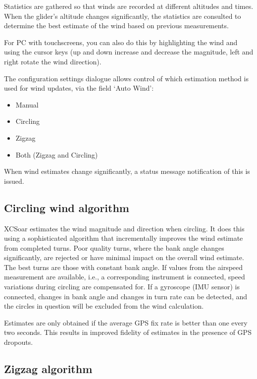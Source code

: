 Statistics are gathered so that winds are recorded at different
altitudes and times.  When the glider's altitude changes significantly,
the statistics are consulted to determine the best estimate of the
wind based on previous measurements.

For PC with touchscreens, you can
also do this by highlighting the wind {\InfoBox} and using the cursor
keys (up and down increase and decrease the magnitude, left and right
rotate the wind direction).

The configuration  settings dialogue allows control of which
estimation method is used for wind updates, via the field `Auto Wind':
\begin{itemize}
\item Manual
\item Circling
\item Zigzag
\item Both (Zigzag and Circling)
\end{itemize}

When wind estimates change significantly, a status message
notification of this is issued.

\subsection*{Circling wind algorithm}

XCSoar estimates the wind magnitude and direction when circling.  It
does this using a sophisticated algorithm that incrementally improves
the wind estimate from completed turns.  Poor quality turns, where
the bank angle changes significantly, are rejected or have minimal
impact on the overall wind estimate.  The best turns are those with
constant bank angle.
If values from the airspeed measurement are available, i.e., a
corresponding instrument is connected,
speed variations during circling are compensated for.
If a gyroscope (IMU sensor) is connected, changes in bank angle and
changes in turn rate can be detected, and the circles in question
will be excluded from the wind calculation.

Estimates are only obtained if the average GPS fix rate is better than
one every two seconds.  This results in improved fidelity of estimates
in the presence of GPS dropouts.


\subsection*{Zigzag algorithm}

